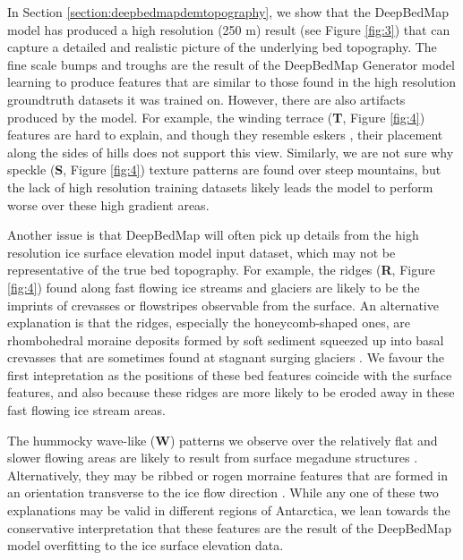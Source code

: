 \documentclass[tc, manuscript]{copernicus}
\begin{document}
In Section \ref{section:deepbedmapdemtopography}, we show that the DeepBedMap model has produced a high resolution (250 m) result (see Figure \ref{fig:3}) that can capture a detailed and realistic picture of the underlying bed topography.
The fine scale bumps and troughs are the result of the DeepBedMap Generator model learning to produce features that are similar to those found in the high resolution groundtruth datasets it was trained on.
However, there are also artifacts produced by the model.
For example, the winding terrace (\textbf{T}, Figure \ref{fig:4}) features are hard to explain, and though they resemble eskers \citep{DrewsActivelyevolvingsubglacial2017}, their placement along the sides of hills does not support this view.
Similarly, we are not sure why speckle (\textbf{S}, Figure \ref{fig:4}) texture patterns are found over steep mountains, but the lack of high resolution training datasets likely leads the model to perform worse over these high gradient areas.

Another issue is that DeepBedMap will often pick up details from the high resolution ice surface elevation model \citep{HowatReferenceElevationModel2019} input dataset, which may not be representative of the true bed topography.
For example, the ridges (\textbf{R}, Figure \ref{fig:4}) found along fast flowing ice streams and glaciers are likely to be the imprints of crevasses or flowstripes \citep{GlasserLongitudinalsurfacestructures2012} observable from the surface.
An alternative explanation is that the ridges, especially the honeycomb-shaped ones, are rhombohedral moraine deposits formed by soft sediment squeezed up into basal crevasses that are sometimes found at stagnant surging glaciers \citep{Dowdeswellvarietydistributionsubmarine2016,DowdeswellRhombohedralcrevassefillridges2016,SolheimSeafloormorphologyoutside1985}.
We favour the first intepretation as the positions of these bed features coincide with the surface features, and also because these ridges are more likely to be eroded away in these fast flowing ice stream areas.

The hummocky wave-like (\textbf{W}) patterns we observe over the relatively flat and slower flowing areas are likely to result from surface megadune structures \citep{ScambosSnowMegadune2014}.
Alternatively, they may be ribbed or rogen morraine features that are formed in an orientation transverse to the ice flow direction  \citep{HattestrandRibbedmorainesSweden1997,HattestrandRibbedmoraineformation1999}.
While any one of these two explanations may be valid in different regions of Antarctica, we lean towards the conservative interpretation that these features are the result of the DeepBedMap model overfitting to the ice surface elevation data.
\end{document}
